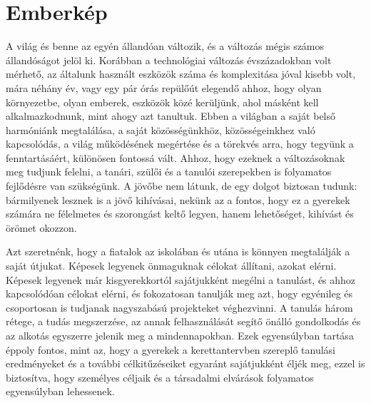 \hypertarget{emberkep}{%
\section{Emberkép}\label{emberkep}}

A világ és benne az egyén állandóan változik, és a változás mégis számos
állandóságot jelöl ki. Korábban a technológiai változás évszázadokban
volt mérhető, az általunk használt eszközök száma és komplexitása jóval
kisebb volt, mára néhány év, vagy egy pár órás repülőút elegendő ahhoz,
hogy olyan környezetbe, olyan emberek, eszközök közé kerüljünk, ahol
másként kell alkalmazkodnunk, mint ahogy azt tanultuk. Ebben a világban
a saját belső harmóniánk megtalálása, a saját közösségünkhöz,
közösségeinkhez való kapcsolódás, a világ működésének megértése és a
törekvés arra, hogy tegyünk a fenntartásáért, különösen fontossá vált.
Ahhoz, hogy ezeknek a változásoknak meg tudjunk felelni, a tanári,
szülői és a tanulói szerepekben is folyamatos fejlődésre van szükségünk.
A jövőbe nem látunk, de egy dolgot biztosan tudunk: bármilyenek
lesznek is a jövő kihívásai, nekünk az a fontos, hogy ez a gyerekek számára
ne félelmetes és szorongást keltő legyen, hanem lehetőséget, kihívást és
örömet okozzon.

Azt szeretnénk, hogy a fiatalok az iskolában és utána is könnyen
megtalálják a saját útjukat. Képesek legyenek önmaguknak célokat
állítani, azokat elérni. Képesek legyenek már kisgyerekkortól
sajátjukként megélni a tanulást, és ahhoz kapcsolódóan célokat elérni, és
fokozatosan tanulják meg azt, hogy egyénileg és csoportosan is tudjanak
nagyszabású projekteket véghezvinni. A tanulás három rétege, a tudás
megszerzése, az annak felhasználását segítő önálló gondolkodás és az
alkotás egyszerre jelenik meg a mindennapokban. Ezek egyensúlyban
tartása éppoly fontos, mint az, hogy a gyerekek a kerettantervben
szereplő tanulási eredményeket és a további célkitűzéseiket egyaránt
sajátjukként éljék meg, ezzel is biztosítva, hogy személyes céljaik és a
társadalmi elvárások folyamatos egyensúlyban lehessenek.

